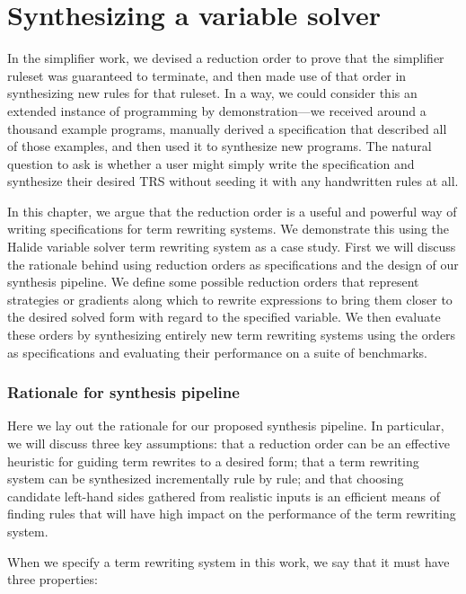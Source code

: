 \chapter{Synthesizing a variable solver}
\label{chapter:synthfromscratch}

In the simplifier work, we devised a reduction order to prove that the simplifier ruleset was guaranteed to terminate, and then made use of that order in synthesizing new rules for that ruleset. In a way, we could consider this an extended instance of programming by demonstration---we received around a thousand example programs, manually derived a specification that described all of those examples, and then used it to synthesize new programs. The natural question to ask is whether a user might simply write the specification and synthesize their desired TRS without seeding it with any handwritten rules at all.

In this chapter, we argue that the reduction order is a useful and powerful way of writing specifications for term rewriting systems. We demonstrate this using the Halide variable solver term rewriting system as a case study. First we will discuss the rationale behind using reduction orders as specifications and the design of our synthesis pipeline. We define some possible reduction orders that represent strategies or gradients along which to rewrite expressions to bring them closer to the desired solved form with regard to the specified variable. We then evaluate these orders by synthesizing entirely new term rewriting systems using the orders as specifications and evaluating their performance on a suite of benchmarks.

\subsection{Rationale for synthesis pipeline}

Here we lay out the rationale for our proposed synthesis pipeline. In particular, we will discuss three key assumptions: that a reduction order can be an effective heuristic for guiding term rewrites to a desired form; that a term rewriting system can be synthesized incrementally rule by rule; and that choosing candidate left-hand sides gathered from realistic inputs is an efficient means of finding rules that will have high impact on the performance of the term rewriting system.

When we specify a term rewriting system in this work, we say that it must have three properties:


